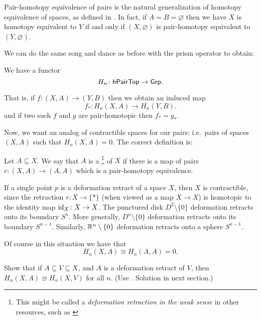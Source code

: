 \begin{remark}
	Pair-homotopy equivalence of pairs is the natural generalization of homotopy equivalence of
	spaces, as defined in . In fact, if $A = B = \varnothing$ then we
	have $X$ is homotopy equivalent to $Y$ if and only if $(X, \varnothing)$ is pair-homotopy
	equivalent to $(Y, \varnothing)$.
\end{remark}

We can do the same song and dance as before with the prism operator to obtain:
\begin{lemma}
	We have a functor
	\[ H_n \colon \mathsf{hPairTop} \to \mathsf{Grp}. \]
\end{lemma}
That is, if $f \colon (X,A) \to (Y,B)$ then we obtain an induced map
\[ f_\ast \colon H_n(X,A) \to H_n(Y,B). \]
and if two such $f$ and $g$ are pair-homotopic
then $f_\ast = g_\ast$.

Now, we want an analog of contractible spaces for our pairs:
i.e.\ pairs of spaces $(X,A)$ such that $H_n(X,A) = 0$.
The correct definition is:
\begin{definition}
	Let $A \subseteq X$.
	We say that $A$ is a \footnote{This might be called a
	\emph{deformation retraction in the weak sense} in other resources, such as \cite{ref:hatcher}}
	of $X$ if there is a map of pairs $r \colon (X, A) \to (A, A)$
	which is a pair-homotopy equivalence.
\end{definition}
\begin{example}
	\listhack
	\begin{enumerate}[(a)]
		\ii If a single point $p$ is a deformation retract of a space $X$,
		then $X$ is contractible, since the retraction $r \colon X \to \{\ast\}$
		(when viewed as a map $X \to X$)
		is homotopic to the identity map $\mathrm{id}_X \colon X \to X$.
		\ii The punctured disk $D^2 \setminus \{0\}$
		deformation retracts onto its boundary $S^1$.
		\ii More generally, $D^{n} \setminus \{0\}$
		deformation retracts onto its boundary $S^{n-1}$.
		\ii Similarly, $\mathbb R^n \setminus \{0\}$
		deformation retracts onto a sphere $S^{n-1}$.
	\end{enumerate}
\end{example}
Of course in this situation we have that
\[ H_n(X,A) \cong H_n(A,A) = 0. \]

\begin{exercise}
	Show that if $A \subseteq V \subseteq X$,
	and $A$ is a deformation retract of $V$,
	then $H_n(X,A) \cong H_n(X,V)$ for all $n$.
	(Use . Solution in next section.)
\end{exercise}

